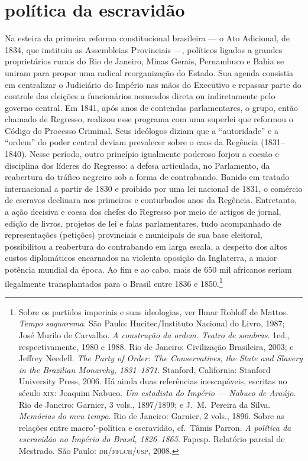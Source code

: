 \section{política da escravidão}
 Na esteira da primeira reforma constitucional brasileira --- o Ato
Adicional, de 1834, que instituiu as Assembleias Provinciais ---,
políticos ligados a grandes proprietários rurais do Rio de Janeiro,
Minas Gerais, Pernambuco e Bahia se uniram para propor uma radical
reorganização do Estado. Sua agenda consistia em centralizar o
Judiciário do Império nas mãos do Executivo e repassar parte do
controle das eleições a funcionários nomeados direta ou indiretamente
pelo governo central. Em 1841, após anos de contendas parlamentares, o
grupo, então chamado de Regresso, realizou esse programa com uma
superlei que reformou o Código do Processo Criminal. Seus ideólogos
diziam que a ``autoridade'' e a ``ordem'' do poder central deviam
prevalecer sobre o caos da Regência (1831--1840). Nesse período, outro
princípio igualmente poderoso forjou a coesão e disciplina dos líderes
do Regresso: a defesa articulada, no Parlamento, da reabertura do
tráfico negreiro sob a forma de contrabando. Banido em tratado
internacional a partir de 1830 e proibido por uma lei nacional de 1831,
o comércio de escravos declinara nos primeiros e conturbados anos da
Regência. Entretanto, a ação decisiva e coesa dos chefes do Regresso
por meio de artigos de jornal, edição de livros, projetos de lei e
falas parlamentares, tudo acompanhado de representações (petições)
provinciais e municipais de sua base eleitoral, possibilitou a
reabertura do contrabando em larga escala, a despeito dos altos custos
diplomáticos encarnados na violenta oposição da Inglaterra, a maior
potência mundial da época. Ao fim e ao cabo, mais de 650 mil africanos
seriam ilegalmente transplantados para o Brasil entre 1836 e
1850.\footnote{ Sobre os partidos imperiais e suas ideologias, ver
Ilmar Rohloff de Mattos. \textit{Tempo saquarema}. São Paulo:
Hucitec/Instituto Nacional do Livro, 1987; José Murilo de Carvalho.
\textit{A construção da ordem. Teatro de sombras}. 1\ai ed.,
respectivamente, 1980 e 1988. Rio de Janeiro: Civilização Brasileira,
2003; e Jeffrey Needell. \textit{The Party of Order: The Conservatives,
the State and Slavery in the Brazilian Monarchy, 1831--1871}.
Stanford, California: Stanford University Press, 2006. Há ainda duas
referências inescapáveis, escritas no século \textsc{xix}: Joaquim Nabuco.
\textit{Um estadista do Império --- Nabuco de Araújo}. Rio de Janeiro:
Garnier, 3 vols., 1897/1899; e J.~M.~Pereira da Silva. \textit{Memórias
do meu tempo}. Rio de Janeiro: Garnier, 2 vols., 1896. Sobre as
relações entre macro"-política e escravidão, cf.~Tâmis Parron.
\textit{A política da escravidão no Império do Brasil, 1826--1865}.
Fapesp. Relatório parcial de Mestrado. São Paulo: \textsc{dh/fflch/usp}, 2008.} 

